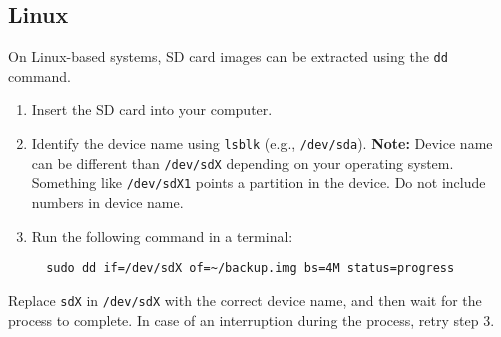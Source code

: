 \subsection{Linux}
\label{subsec:extracting_linux}

On Linux-based systems, SD card images can be extracted using the \texttt{dd} command.
\begin{enumerate}
  \item Insert the SD card into your computer.
  \item Identify the device name using \texttt{lsblk} (e.g., \texttt{/dev/sda}). \textbf  \newline\textbf{Note:} Device name can be different than \texttt{/dev/sdX} depending on your operating system. Something like \texttt{/dev/sdX1} points a partition in the device. Do not include numbers in device name.
  \item Run the following command in a terminal:
  \begin{verbatim}
  sudo dd if=/dev/sdX of=~/backup.img bs=4M status=progress
  \end{verbatim}
\end{enumerate}

Replace \texttt{sdX} in \texttt{/dev/sdX} with the correct device name, and then wait for the process to complete. In case of an interruption during the process, retry step 3.
